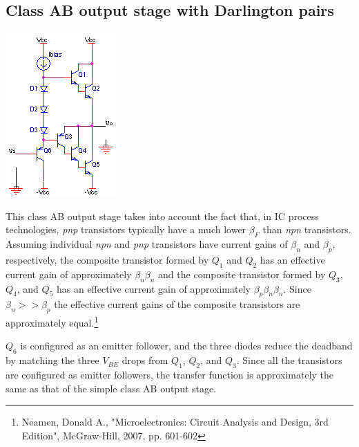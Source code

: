 \subsection{Class AB output stage with Darlington pairs}
\begin{center}
	\includegraphics{schematics/classABdarlington.PNG}
\end{center}
This class AB output stage takes into account the fact that, in IC process technologies, \textit{pnp} transistors typically have a much lower $\beta_{F}$ than \textit{npn} transistors. Assuming individual \textit{npn} and \textit{pnp} transistors have current gains of $\beta_{n}$ and $\beta_{p}$, respectively, the composite transistor formed by $Q_{1}$ and $Q_{2}$ has an effective current gain of approximately $\beta_{n}\beta_{n}$ and the composite transistor formed by $Q_{3}$, $Q_{4}$, and $Q_{5}$ has an effective current gain of approximately $\beta_{p}\beta_{n}\beta_{n}$. Since $\beta_{n} >> \beta_{p}$ the effective current gains of the composite transistors are approximately equal.\footnote{Neamen, Donald A., "Microelectronics: Circuit Analysis and Design, 3rd Edition", McGraw-Hill, 2007, pp. 601-602}
\par
$Q_{6}$ is configured as an emitter follower, and the three diodes reduce the deadband by matching the three $V_{BE}$ drops from $Q_{1}$, $Q_{2}$, and $Q_{3}$. Since all the transistors are configured as emitter followers, the transfer function is approximately the same as that of the simple class AB output stage.

